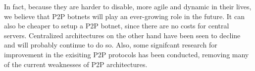 \documentclass{llncs}
\begin{document}
In fact, because they are harder to disable, more agile and dynamic in
their lives, we believe that P2P botnets will play an ever-growing
role in the future. It can also be cheaper to setup a P2P botnet,
since there are no costs for central servers. Centralized
architectures on the other hand have been seen to decline and will
probably continue to do so. Also, some signifcant research for
improvement in the exisiting P2P protocols has been conducted,
removing many of the current weaknesses of P2P architectures.




\end{document}
